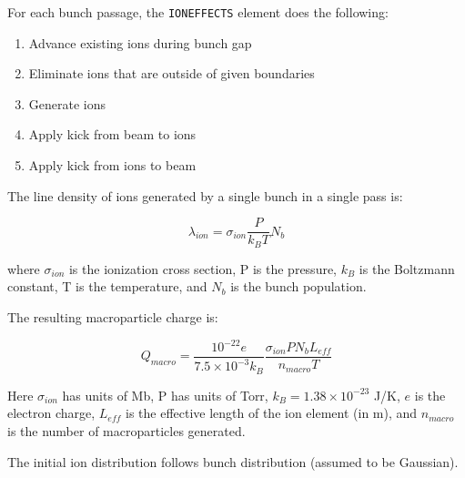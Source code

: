 
For each bunch passage, the \verb|IONEFFECTS| element does the following:

\begin{enumerate}
\item Advance existing ions during bunch gap
\item Eliminate ions that are outside of given boundaries
\item Generate ions 
\item Apply kick from beam to ions 
\item Apply kick from ions to beam
\end{enumerate}


The line density of ions generated by a single bunch in a single pass is:

\begin{equation}
\lambda_{ion} = \sigma_{ion} \frac{P}{k_B T} N_b
\end{equation}

where $\sigma_{ion}$ is the ionization cross section, P is the pressure, $k_B$ is the Boltzmann constant, T is the temperature, and $N_b$ is the bunch population.

The resulting macroparticle charge is:

\begin{equation}
Q_{macro} = \frac{10^{-22} e}{7.5\times10^{-3} k_B} \frac{\sigma_{ion} P N_b L_{eff}}{n_{macro} T}
\end{equation}

Here $\sigma_{ion}$ has units of Mb, P has units of Torr, $k_B = 1.38\times10^{-23}$ J/K, $e$ is the electron charge, $L_{eff}$ is the effective length of the ion element (in m), and $n_{macro}$ is the number of macroparticles generated.

The initial ion distribution follows bunch distribution (assumed to be Gaussian).


